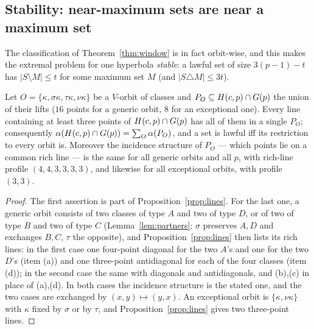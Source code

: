 \subsection*{Stability: near-maximum sets are near a maximum set}

The classification of Theorem~\ref{thm:window} is in fact orbit-wise, and this makes the extremal problem for one hyperbola
\emph{stable}: a lawful set of size $3(p-1)-t$ has $|S\setminus M|\le t$ for some maximum set $M$ (and $|S\triangle M|\le3t$).

\begin{lemma}\label{lem:orbdec}
Let $O=\{\kappa,\sigma\kappa,\tau\kappa,\nu\kappa\}$ be a $V$-orbit of classes and $P_O\subseteq H(c,p)\cap G(p)$ the union of their lifts
($16$ points for a generic orbit, $8$ for an exceptional one).  Every line containing at least three points of $H(c,p)\cap G(p)$ has all of
them in a single $P_O$; consequently $\alpha(H(c,p)\cap G(p))=\sum_O\alpha(P_O)$, and a set is lawful iff its restriction to every orbit is.
Moreover the incidence structure of $P_O$ --- which points lie on a common rich line --- is the same for all generic orbits and all $p$,
with rich-line profile $(4,4,3,3,3,3)$, and likewise for all exceptional orbits, with profile $(3,3)$.
\end{lemma}
\begin{proof}
The first assertion is part of Proposition~\ref{prop:lines}.  For the last one, a generic orbit consists of two classes of type $A$ and two
of type $D$, or of two of type $B$ and two of type $C$ (Lemma~\ref{lem:partners}: $\sigma$ preserves $A,D$ and exchanges $B,C$, $\tau$ the
opposite), and Proposition~\ref{prop:lines} then lists its rich lines: in the first case one four-point diagonal for the two $A$'s and one
for the two $D$'s (item (a)) and one three-point antidiagonal for each of the four classes (item (d)); in the second case the same with
diagonals and antidiagonals, and (b),(c) in place of (a),(d).  In both cases the incidence structure is the stated one, and the two cases
are exchanged by $(x,y)\mapsto(y,x)$.  An exceptional orbit is $\{\kappa,\nu\kappa\}$ with $\kappa$ fixed by $\sigma$ or by $\tau$, and
Proposition~\ref{prop:lines} gives two three-point lines.
\end{proof}


